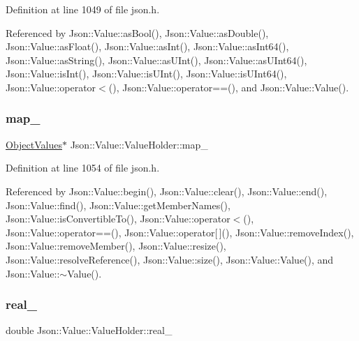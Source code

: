 Definition at line 1049 of file json.\+h.



Referenced by Json\+::\+Value\+::as\+Bool(), Json\+::\+Value\+::as\+Double(), Json\+::\+Value\+::as\+Float(), Json\+::\+Value\+::as\+Int(), Json\+::\+Value\+::as\+Int64(), Json\+::\+Value\+::as\+String(), Json\+::\+Value\+::as\+U\+Int(), Json\+::\+Value\+::as\+U\+Int64(), Json\+::\+Value\+::is\+Int(), Json\+::\+Value\+::is\+U\+Int(), Json\+::\+Value\+::is\+U\+Int64(), Json\+::\+Value\+::operator$<$(), Json\+::\+Value\+::operator==(), and Json\+::\+Value\+::\+Value().

\mbox{\label{union_json_1_1_value_1_1_value_holder_a1e7a5b86d4f52234f55c847ad1ce389a}} 
\subsubsection{\texorpdfstring{map\+\_\+}{map\_}}
{\footnotesize\ttfamily \hyperlink{class_json_1_1_value_a08b6c80c3af7071d908dabf044de5388}{Object\+Values}$\ast$ Json\+::\+Value\+::\+Value\+Holder\+::map\+\_\+}



Definition at line 1054 of file json.\+h.



Referenced by Json\+::\+Value\+::begin(), Json\+::\+Value\+::clear(), Json\+::\+Value\+::end(), Json\+::\+Value\+::find(), Json\+::\+Value\+::get\+Member\+Names(), Json\+::\+Value\+::is\+Convertible\+To(), Json\+::\+Value\+::operator$<$(), Json\+::\+Value\+::operator==(), Json\+::\+Value\+::operator\mbox{[}$\,$\mbox{]}(), Json\+::\+Value\+::remove\+Index(), Json\+::\+Value\+::remove\+Member(), Json\+::\+Value\+::resize(), Json\+::\+Value\+::resolve\+Reference(), Json\+::\+Value\+::size(), Json\+::\+Value\+::\+Value(), and Json\+::\+Value\+::$\sim$\+Value().

\mbox{\label{union_json_1_1_value_1_1_value_holder_af0c5ca724e5fe3a15db773d750e2351e}} 
\subsubsection{\texorpdfstring{real\+\_\+}{real\_}}
{\footnotesize\ttfamily double Json\+::\+Value\+::\+Value\+Holder\+::real\+\_\+}



